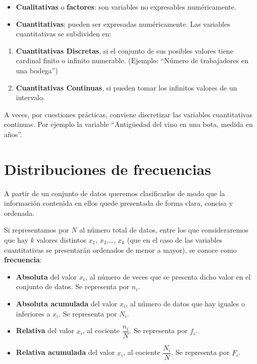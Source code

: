 \documentclass[]{book}
\theoremstyle{definition}
\theoremstyle{definition}
\theoremstyle{definition}
\theoremstyle{remark}
\begin{document}
\begin{itemize}
\item
  \textbf{Cualitativas} o \textbf{factores}: son variables no
  expresables numéricamente.
\item
  \textbf{Cuantitativas}: pueden ser expresadas numéricamente. Las
  variables cuantitativas se subdividen en:
\end{itemize}

\begin{enumerate}
\def\labelenumi{\arabic{enumi}.}
\item
  \textbf{Cuantitativas Discretas}, si el conjunto de sus posibles
  valores tiene cardinal finito o infinito numerable. (Ejemplo: ``Número
  de trabajadores en una bodega'')
\item
  \textbf{Cuantitativas Continuas}, si pueden tomar los infinitos
  valores de un intervalo.
\end{enumerate}

A veces, por cuestiones prácticas, conviene discretizar las variables
cuantitativas continuas. Por ejemplo la variable ``Antigüedad del vino
en una bota, medida en años''.

\section{Distribuciones de
frecuencias}\label{distribuciones-de-frecuencias}

A partir de un conjunto de datos queremos clasificarlos de modo que la
información contenida en ellos quede presentada de forma clara, concisa
y ordenada.

Si representamos por \(N\) al número total de datos, entre los que
consideraremos que hay \(k\) valores distintos \(x_1\),
\(x_2\),\ldots{}, \(x_k\) (que en el caso de las variables cuantitativas
se presentarán ordenados de menor a mayor), se conoce como
\textbf{frecuencia}:

\begin{itemize}
\item
  \textbf{Absoluta} del valor \(x_i\), al número de veces que se
  presenta dicho valor en el conjunto de datos. Se representa por
  \(n_i\).
\item
  \textbf{Absoluta acumulada} del valor \(x_i\), al número de datos que
  hay iguales o inferiores a \(x_i\). Se representa por \(N_i\).
\item
  \textbf{Relativa} del valor \(x_i\), al cociente \(\dfrac{n_i}{N}\).
  Se representa por \(f_i\).
\item
  \textbf{Relativa acumulada} del valor \(x_i\), al cociente
  \(\dfrac{N_i}{N}\). Se representa por \(F_i\).
\end{itemize}
\end{document}
